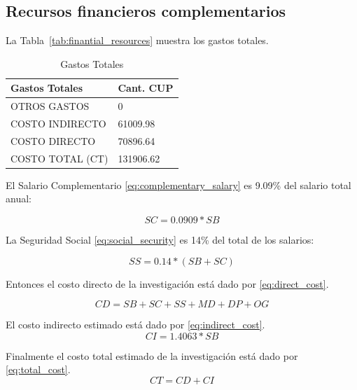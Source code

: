 \documentclass[conference, a4paper]{IEEEtran}
\begin{document}
\subsection{Recursos financieros complementarios}\label{subsec:recursos-financieros-complementarios} La Tabla~\ref{tab:finantial_resources} muestra los gastos totales.
%

\begin{table}[htpb]
	\caption{Gastos Totales}
	\label{tab:finantial_resources}
	\begin{tabularx}{\columnwidth}{|XX|}
		\hline
		Gastos Totales & Cant.
		CUP                    \\ \hline OTROS GASTOS & 0 \\ COSTO INDIRECTO & 61009.98 \\ COSTO DIRECTO & 70896.64 \\ COSTO TOTAL (CT) & 131906.62 \\

		\hline
	\end{tabularx}\label{tab:table}

\end{table}

El Salario Complementario \ref{eq:complementary_salary} es 9.09\% del salario
total anual:

\begin{equation}
	\label{eq:complementary_salary} SC=0.0909*SB
\end{equation}

La Seguridad Social \ref{eq:social_security} es 14\% del total de los salarios:

\begin{equation}
	\label{eq:social_security} SS=0.14*(SB+SC)
\end{equation}

Entonces el costo directo de la investigación está dado por
\ref{eq:direct_cost}.

\begin{equation}
	\label{eq:direct_cost}
	CD=SB+SC+SS+MD+DP+OG
\end{equation}

El costo indirecto estimado está dado por \ref{eq:indirect_cost}.
\begin{equation}
	\label{eq:indirect_cost}
	CI=1.4063*SB
\end{equation}

Finalmente el costo total estimado de la investigación está dado por
\ref{eq:total_cost}.
\begin{equation}
	\label{eq:total_cost}
	CT=CD+CI
\end{equation}
\end{document}

